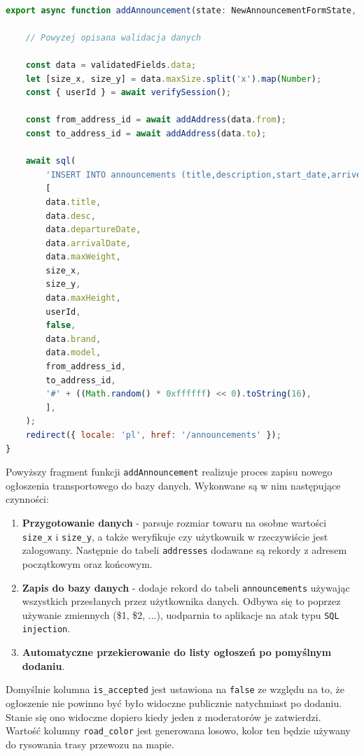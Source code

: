 {\belowcaptionskip=-9pt
\begin{lstlisting}[language=JavaScript,caption=Implementacja dodawania ogłoszenia do bazy danych, label=lst:addAnnouncementToDB]

export async function addAnnouncement(state: NewAnnouncementFormState, formData: FormData) {

    // Powyzej opisana walidacja danych

    const data = validatedFields.data;
    let [size_x, size_y] = data.maxSize.split('x').map(Number);
    const { userId } = await verifySession();

    const from_address_id = await addAddress(data.from);
    const to_address_id = await addAddress(data.to);

    await sql(
        'INSERT INTO announcements (title,description,start_date,arrive_date,max_weight,size_x,size_y,max_height,author_id,is_accepted,vehicle_brand,vehicle_model,from_address_id,to_address_id,road_color)VALUES($1,$2,$3,$4,$5,$6,$7,$8,$9,$10,$11,$12,$13,$14,$15)',
        [
        data.title,
        data.desc,
        data.departureDate,
        data.arrivalDate,
        data.maxWeight,
        size_x,
        size_y,
        data.maxHeight,
        userId,
        false,
        data.brand,
        data.model,
        from_address_id,
        to_address_id,
        '#' + ((Math.random() * 0xffffff) << 0).toString(16),
        ],
    );
    redirect({ locale: 'pl', href: '/announcements' });
}
\end{lstlisting}
}

\pagebreak
Powyższy fragment funkcji \texttt{addAnnouncement} realizuje proces zapisu nowego ogłoszenia transportowego do bazy danych. Wykonwane są w nim następujące czynności:
\begin{enumerate}
    \item \textbf{Przygotowanie danych} - parsuje rozmiar towaru na osobne wartości \texttt{size\_x} i \texttt{size\_y}, a także weryfikuje czy użytkownik w rzeczywiście jest zalogowany. Następnie do tabeli \texttt{addresses} dodawane są rekordy z adresem początkowym oraz końcowym.
    \item \textbf{Zapis do bazy danych} - dodaje rekord do tabeli \texttt{announcements} używając wszystkich przesłanych przez użytkownika danych. Odbywa się to poprzez używanie zmiennych (\$1, \$2, ...), uodparnia to aplikacje na atak typu \texttt{SQL injection}.
    \item \textbf{Automatyczne przekierowanie do listy ogłoszeń po pomyślnym dodaniu}.
\end{enumerate}
Domyślnie kolumna \texttt{is\_accepted} jest ustawiona na \texttt{false} ze względu na to, że ogłoszenie nie powinno być było widoczne publicznie natychmiast po dodaniu. Stanie się ono widoczne dopiero kiedy jeden z moderatorów je zatwierdzi. Wartość kolumny \texttt{road\_color} jest generowana losowo, kolor ten będzie używany do rysowania trasy przewozu na mapie.

